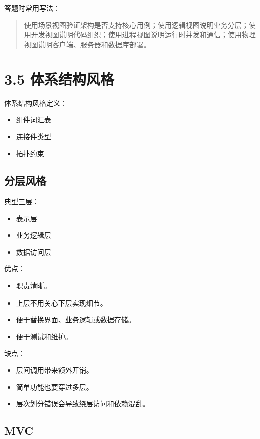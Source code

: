 \documentclass[UTF8,zihao=-4]{ctexart}
\begin{document}
答题时常用写法：

\begin{quote}
使用场景视图验证架构是否支持核心用例；使用逻辑视图说明业务分层；使用开发视图说明代码组织；使用进程视图说明运行时并发和通信；使用物理视图说明客户端、服务器和数据库部署。
\end{quote}

\section{3.5 体系结构风格}

体系结构风格定义：

\begin{itemize}
\item 组件词汇表
\item 连接件类型
\item 拓扑约束
\end{itemize}

\subsection{分层风格}

典型三层：

\begin{itemize}
\item 表示层
\item 业务逻辑层
\item 数据访问层
\end{itemize}

优点：

\begin{itemize}
\item 职责清晰。
\item 上层不用关心下层实现细节。
\item 便于替换界面、业务逻辑或数据存储。
\item 便于测试和维护。
\end{itemize}

缺点：

\begin{itemize}
\item 层间调用带来额外开销。
\item 简单功能也要穿过多层。
\item 层次划分错误会导致绕层访问和依赖混乱。
\end{itemize}

\subsection{MVC}
\end{document}
